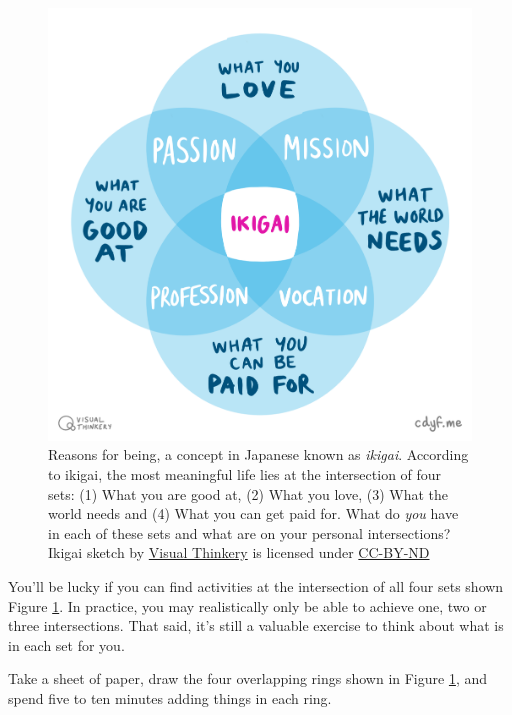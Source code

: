 \documentclass[
]{book}
\begin{document}
\begin{figure}

{\centering \includegraphics[width=1\linewidth]{images/IKIGAI-visual-thinkery} 

}

\caption{Reasons for being, a concept in Japanese known as \emph{ikigai}. According to ikigai, the most meaningful life lies at the intersection of four sets: (1) What you are good at, (2) What you love, (3) What the world needs and (4) What you can get paid for. What do \emph{you} have in each of these sets and what are on your personal intersections? Ikigai sketch by \href{https://visualthinkery.com}{Visual Thinkery} is licensed under \href{https://creativecommons.org/licenses/by-nd/4.0/}{CC-BY-ND}}\label{fig:iki-fig}
\end{figure}



You'll be lucky if you can find activities at the intersection of all four sets shown Figure \ref{fig:iki-fig}. In practice, you may realistically only be able to achieve one, two or three intersections. That said, it's still a valuable exercise to think about what is in each set for you.

Take a sheet of paper, draw the four overlapping rings shown in Figure \ref{fig:iki-fig}, and spend five to ten minutes adding things in each ring.
\end{document}
